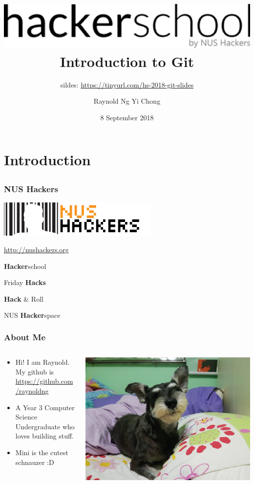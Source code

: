 \documentclass[12pt]{beamer}
\title{ \includegraphics[width=0.5\linewidth]{hackerschool} \\ Introduction  to Git}
\subtitle[Time to Git Gud]{sildes: \url{https://tinyurl.com/hs-2018-git-slides}}
\author{Raynold Ng Yi Chong}
\date{8 September 2018}
\begin{document}
\frame{\titlepage}

\section{Introduction}
\subsection{}

\begin{frame}
\frametitle{NUS Hackers}

\begin{center}	
\includegraphics[width=0.5\linewidth]{NUSHackers}

\url{http://nushackers.org}
\end{center}

\begin{center}
	\textbf{Hacker}school
	
	Friday \textbf{Hacks}
	
	\textbf{Hack} \& Roll
	
	NUS \textbf{Hacker}space
\end{center}

\end{frame}

\begin{frame}
\frametitle{About Me}

\begin{columns}
	\begin{column}{0.5\linewidth}
\footnotesize
\begin{itemize}
	\item Hi! I am Raynold. My github is \url{https://github.com/raynoldng}
	\item A Year 3 Computer Science Undergraduate who loves building stuff.
	\item Mini is the cutest schnauzer :D 
\end{itemize}
	\end{column}
	\begin{column}{0.5\linewidth}
		\includegraphics[width=0.8\linewidth]{dog}
	\end{column}
\end{columns}


\end{frame}
\end{document}

